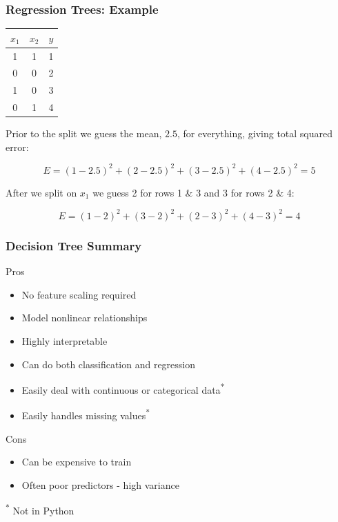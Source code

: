 \documentclass[table,dvipsnames]{beamer}
\begin{document}

\begin{frame}
\frametitle{Regression Trees: Example}
\begin{table}
\begin{tabular}{c|c|c}
    \hline
    $x_1$   & $x_2$     & $y$ \\
    \hline
    1       & 1         & 1 \\
    0       & 0         & 2 \\
    1       & 0         & 3 \\
    0       & 1         & 4 \\
    \hline
\end{tabular}
\end{table}
\small
Prior to the split we guess the mean, $2.5$, for everything, giving total squared error:

$$E = (1-2.5)^2 + (2-2.5)^2 + (3-2.5)^2 + (4-2.5)^2  = 5$$

After we split on $x_1$ we guess 2 for rows 1 \& 3 and 3 for rows 2 \& 4:

$$ E = (1-2)^2 + (3-2)^2 + (2-3)^2 + (4-3)^2 = 4 $$
\end{frame}


\begin{frame}
\frametitle{Decision Tree Summary}
Pros
\begin{itemize}
    \item No feature scaling required
    \item Model nonlinear relationships
    \item Highly interpretable
    \item Can do both classification and regression
    \item Easily deal with continuous or categorical data\textsuperscript{*}
    \item Easily handles missing values\textsuperscript{*}
\end{itemize}

Cons
\begin{itemize}
    \item Can be expensive to train
    \item Often poor predictors - high variance
\end{itemize}

\begin{flushleft}
\tiny{\textsuperscript{*} Not in Python}
\end{flushleft}
\end{frame}
\end{document}
